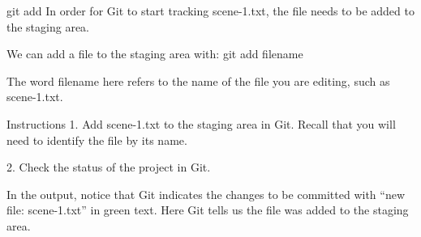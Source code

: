 git add
    In order for Git to start tracking scene-1.txt, the file needs to be added to the staging area.

    We can add a file to the staging area with:
        git add filename
    
    The word filename here refers to the name of the file you are editing, such as scene-1.txt.

Instructions
    1.
    Add scene-1.txt to the staging area in Git. Recall that you will need to identify the file by its name.

    2.
    Check the status of the project in Git.

    In the output, notice that Git indicates the changes to be committed with “new file: scene-1.txt” in green text. Here Git tells us the file was added to the staging area.